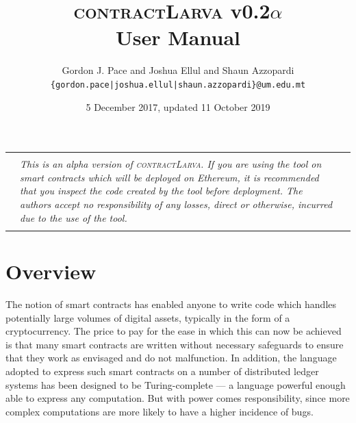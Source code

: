 \documentclass{article}
\newcommand{\contractlarva}{\textsc{contractLarva}\xspace}
\begin{document}
\title{\contractlarva v0.2$\alpha$\\User Manual}
\author{Gordon J. Pace and Joshua Ellul and Shaun Azzopardi\\\texttt{\{gordon.pace|joshua.ellul|shaun.azzopardi\}@um.edu.mt}}
\date{5 December 2017, updated 11 October 2019}
\maketitle


\begin{center}
  \begin{tabular}{|lll|}\hline\qquad&&\qquad\\
    &\begin{minipage}{0.8\textwidth}
      \emph{This is an alpha version of \contractlarva. If you are using the tool on smart contracts which will be deployed on Ethereum, it is recommended that you inspect the code created by the tool before deployment. The authors accept no responsibility of any losses, direct or otherwise, incurred due to the use of the tool.}
    \end{minipage}&\\&&\\
  \hline\end{tabular} 
\end{center}



  \section{Overview}
  
  The notion of smart contracts has enabled anyone to write code which handles potentially large volumes of digital assets, typically in the form of a cryptocurrency. The price to pay for the ease in which this can now be achieved is that many smart contracts are written without necessary safeguards to ensure that they work as envisaged and do not  malfunction. In addition, the language adopted to express such smart contracts on a number of distributed ledger systems has been designed to be Turing-complete --- a language powerful enough able to express any computation. But with power comes responsibility, since more complex computations are more likely to have a higher incidence of bugs. 
\end{document}
